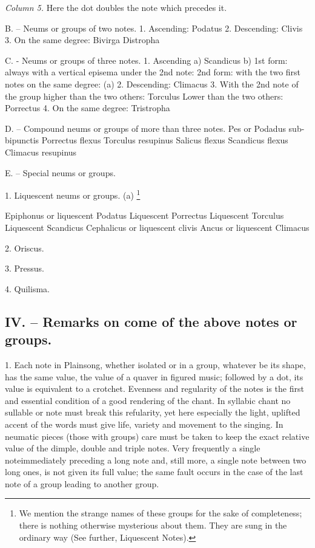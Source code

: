 {\it Column 5.} Here the dot doubles the note which precedes it.

B. -- {\sc Neums or groups of two notes.}
1. Ascending:
Podatus
2. Descending:
Clivis
3. On the same degree:
Bivirga
Distropha

C. - Neums or groups of three notes.
1. Ascending
a) Scandicus
b)
1st form: always with a vertical episema under the 2nd note:
2nd form: with the two first notes on the same degree: (a)
2. Descending:
Climacus
3. With the 2nd note of the group higher than the two others:
Torculus
Lower than the two others:
Porrectus
4. On the same degree:
Tristropha

D. -- Compound neums or groups of more than three notes.
Pes or Podadus sub-bipunctis
Porrectus flexus
Torculus resupinus
Salicus flexus
Scandicus flexus
Climacus resupinus


E. -- Special neums or groups.

1. Liquescent neums or groups. (a) \footnote{We mention the strange names of these groups for the sake of completeness; there is nothing otherwise mysterious about them. They are sung in the ordinary way (See further, Liquescent Notes).}

Epiphonus or liquescent Podatus
Liquescent Porrectus
Liquescent Torculus
Liquescent Scandicus
Cephalicus or liquescent clivis
Ancus or liquescent Climacus

2. Oriscus.

3. Pressus.

4. Quilisma.

\subsection{IV. -- Remarks on come of the above notes or groups.}

1. Each note in Plainsong, whether isolated or in a group, whatever be its shape, has the same value, the value of a quaver in figured music; followed by a dot, its value is equivalent to a crotchet. Evenness and regularity of the notes is the first and essential condition of a good rendering of the chant. In syllabic chant no sullable or note must break this refularity, yet here especially the light, uplifted accent of the words must give life, variety and movement to the singing. In neumatic pieces (those with groups) care must be taken to keep the exact relative value of the dimple, double and triple notes. Very frequently a single noteimmediately preceding a long note and, still more, a single note between two long ones, is not given its full value; the same fault occurs in the case of the last note of a group leading to another group.

